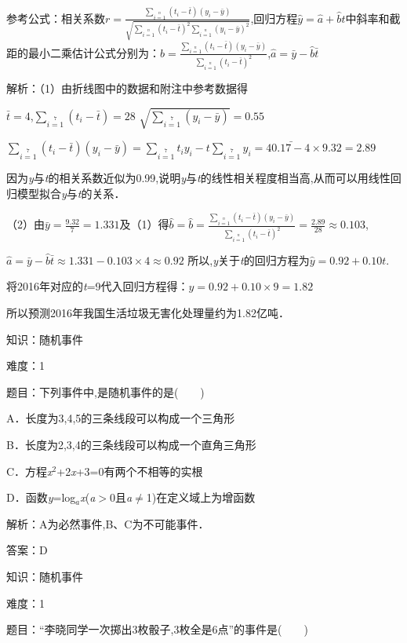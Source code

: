 \documentclass{article} %
\begin{document}
参考公式：相关系数$r=\frac{\sum\limits_{i=1}\limits^{n}(t_i-\bar{t})(y_i-\bar{y})}{\sqrt{\sum\limits_{i=1}\limits^{n}(t_i-\bar{t})^2\sum\limits_{i=1}\limits^{n}(y_i-\bar{y})^2}}$,回归方程$\hat{y}=\hat{a}+\hat{b}t$中斜率和截距的最小二乘估计公式分别为：$\hat{b}=\frac{\sum\limits_{i=1}\limits^{n}(t_i-\bar{t})(y_i-\bar{y})}{\sum\limits_{i=1}\limits^{n}(t_i-\bar{t})^2}$,$\hat{a}=\bar{y}-\hat{b}\bar{t}$

解析：（1）由折线图中的数据和附注中参考数据得

$\bar{t}=4$,$\sum\limits_{i=1}\limits^{7}(t_i-\bar{t})=28$
$\sqrt{\sum\limits_{i=1}\limits^{7}(y_i-\bar{y})}=0.55$

$\sum\limits_{i=1}\limits^{7}(t_i-\bar{t})(y_i-\bar{y})=\sum\limits_{i=1}\limits^{7}t_iy_i-\bar{t\sum\limits_{i=1}\limits^{7}y_i=40.17-4\times9.32=2.89 }$


因为\textit{y}与\textit{t}的相关系数近似为0.99,说明\textit{y}与\textit{t}的线性相关程度相当高,从而可以用线性回归模型拟合\textit{y}与\textit{t}的关系．

（2）由$\bar{y}=\frac{9.32}{7}=1.331$及（1）得$\hat{b}=\hat{b}=\frac{\sum\limits_{i=1}\limits^{n}(t_i-\bar{t})(y_i-\bar{y})}{\sum\limits_{i=1}\limits^{n}(t_i-\bar{t})^2}=\frac{2.89}{28}\approx0.103$,

$\hat{a}=\bar{y}-\hat{b}\bar{t}\approx 1.331-0.103\times 4\approx0.92$
所以,\textit{y}关于\textit{t}的回归方程为$\hat{y}=0.92+0.10t$.

将2016年对应的\textit{t}=9代入回归方程得：$\hat{y}=0.92+0.10\times9=1.82$

所以预测2016年我国生活垃圾无害化处理量约为1.82亿吨．



知识：随机事件

难度：1

题目：下列事件中,是随机事件的是(　　)

A．长度为3,4,5的三条线段可以构成一个三角形

B．长度为2,3,4的三条线段可以构成一个直角三角形

C．方程\textit{x}${}^{2}$+2\textit{x}+3=0有两个不相等的实根

D．函数\textit{y}=log\textit{${}_{a}$x}(\textit{a}$\mathrm{>}$0且\textit{a}$\mathrm{\neq}$1)在定义域上为增函数

解析：A为必然事件,B、C为不可能事件．

答案：D

知识：随机事件

难度：1

题目：``李晓同学一次掷出3枚骰子,3枚全是6点''的事件是(　　)
\end{document}
